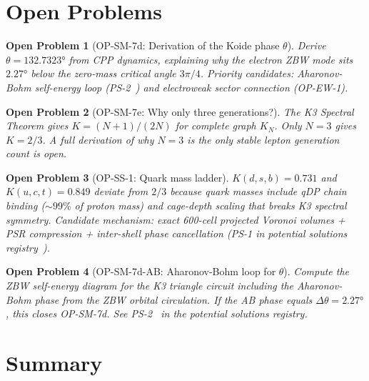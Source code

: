 \documentclass[11pt]{article}
\newtheorem{openproblem}{Open Problem}
\begin{document}
\section{Open Problems}

\begin{openproblem}[OP-SM-7d: Derivation of the Koide phase $\theta$]
\label{op:theta}
Derive $\theta = 132.7323°$ from CPP dynamics, explaining why the
electron ZBW mode sits $2.27°$ below the zero-mass critical angle
$3\pi/4$.  Priority candidates: Aharonov-Bohm self-energy loop
(PS-2~\cite{abshier_ps2}) and electroweak sector connection (OP-EW-1).
\end{openproblem}

\begin{openproblem}[OP-SM-7e: Why only three generations?]
The K3 Spectral Theorem gives $K = (N+1)/(2N)$ for complete graph $K_N$.
Only $N=3$ gives $K = 2/3$.  A full derivation of why $N = 3$ is the
only stable lepton generation count is open.
\end{openproblem}

\begin{openproblem}[OP-SS-1: Quark mass ladder]
\label{op:quarklad}
$K(d,s,b) = 0.731$ and $K(u,c,t) = 0.849$ deviate from $2/3$ because
quark masses include qDP chain binding ($\sim 99\%$ of proton mass) and
cage-depth scaling that breaks K3 spectral symmetry.  Candidate
mechanism: exact 600-cell projected Voronoi volumes + PSR compression
+ inter-shell phase cancellation (PS-1 in potential solutions
registry~\cite{abshier_ps1}).
\end{openproblem}

\begin{openproblem}[OP-SM-7d-AB: Aharonov-Bohm loop for $\theta$]
Compute the ZBW self-energy diagram for the K3 triangle circuit
including the Aharonov-Bohm phase from the ZBW orbital circulation.
If the AB phase equals $\Delta\theta = 2.27°$, this closes OP-SM-7d.
See PS-2~\cite{abshier_ps2} in the potential solutions registry.
\end{openproblem}

\section{Summary}
\end{document}
